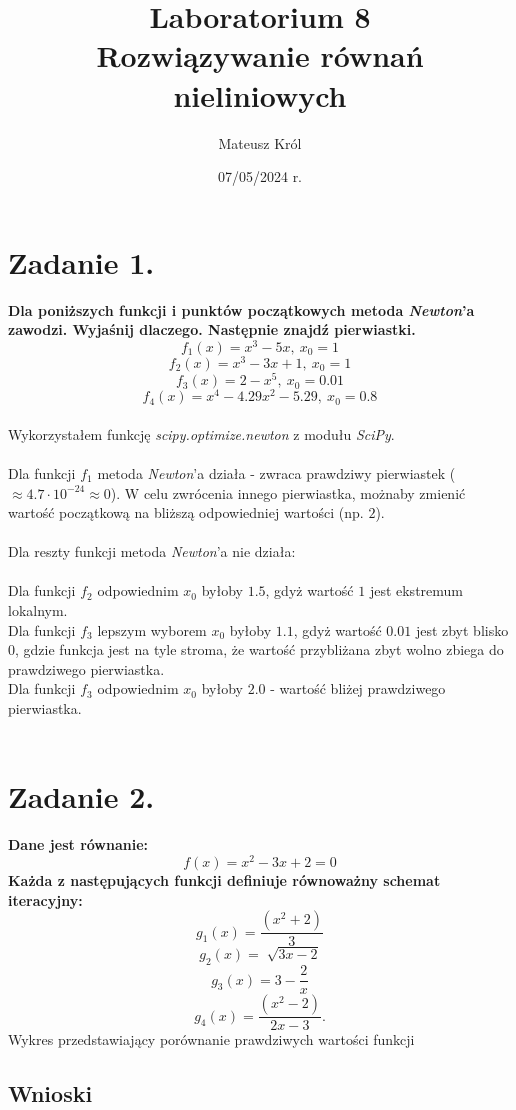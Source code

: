 \documentclass{article}
\title{%
Laboratorium 8\\
  \huge Rozwiązywanie równań nieliniowych}
\author{Mateusz Król}
\date{07/05/2024 r.}
\begin{document}
\maketitle

 
\section*{Zadanie 1.}
\textbf{Dla poniższych funkcji i punktów początkowych metoda 
\textit{Newton}'a
zawodzi. Wyjaśnij dlaczego. Następnie znajdź pierwiastki.
$$f_1(x) = x^3-5x,\ x_0=1$$
$$f_2(x) = x^3-3x+1,\ x_0=1$$
$$f_3(x) = 2-x^5,\ x_0=0.01$$
$$f_4(x) = x^4-4.29x^2-5.29,\ x_0=0.8$$} \\
\null\quad
Wykorzystałem funkcję \textit{scipy.optimize.newton} z modułu
\textit{SciPy}. \\\\
Dla funkcji $f_1$ metoda \textit{Newton}'a działa - zwraca prawdziwy
pierwiastek ($\approx 4.7 \cdot 10^{-24} \approx 0$). W celu zwrócenia
innego pierwiastka, możnaby zmienić wartość początkową na bliższą
odpowiedniej wartości (np. $2$). \\\\
Dla reszty funkcji metoda \textit{Newton}'a nie działa: \\\\
Dla funkcji $f_2$ odpowiednim $x_0$ byłoby $1.5$, gdyż wartość $1$ jest
ekstremum lokalnym. \\
Dla funkcji $f_3$ lepszym wyborem $x_0$ byłoby $1.1$, gdyż wartość
$0.01$ jest zbyt blisko 0, gdzie funkcja jest na tyle stroma, że
wartość przybliżana zbyt wolno zbiega do prawdziwego pierwiastka. \\
Dla funkcji $f_3$ odpowiednim $x_0$ byłoby $2.0$ - wartość bliżej 
prawdziwego pierwiastka. \\\\

\section*{Zadanie 2.}
\textbf{Dane jest równanie: $$f(x)=x^2-3x+2=0$$
Każda z następujących funkcji definiuje równoważny schemat iteracyjny:
$$g_1(x)=\frac{(x^2+2)}{3}$$
$$g_2(x)=\sqrt[]{3x-2}$$
$$g_3(x)=3-\frac{2}{x}$$
$$g_4(x)=\frac{(x^2-2)}{2x-3}.$$
}
\newpage
Wykres przedstawiający porównanie prawdziwych wartości funkcji 


\subsection*{Wnioski}
\null\quad 
\end{document}
